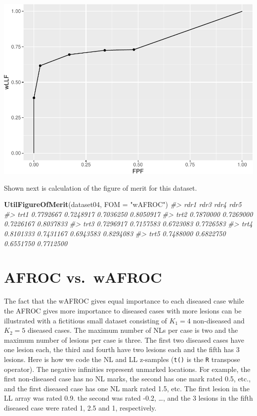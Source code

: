 \documentclass[
]{book}
\newenvironment{Shaded}{\begin{snugshade}}{\end{snugshade}}
\newcommand{\CommentTok}[1]{\textcolor[rgb]{0.56,0.35,0.01}{\textit{#1}}}
\newcommand{\DataTypeTok}[1]{\textcolor[rgb]{0.13,0.29,0.53}{#1}}
\newcommand{\KeywordTok}[1]{\textcolor[rgb]{0.13,0.29,0.53}{\textbf{#1}}}
\newcommand{\NormalTok}[1]{#1}
\newcommand{\StringTok}[1]{\textcolor[rgb]{0.31,0.60,0.02}{#1}}
\begin{document}
\includegraphics{03-empirical_files/figure-latex/unnamed-chunk-10-1.pdf}

Shown next is calculation of the figure of merit for this dataset.

\begin{Shaded}
\begin{Highlighting}[]
\KeywordTok{UtilFigureOfMerit}\NormalTok{(dataset04, }\DataTypeTok{FOM =} \StringTok{"wAFROC"}\NormalTok{)}
\CommentTok{#>           rdr1      rdr3      rdr4      rdr5}
\CommentTok{#> trt1 0.7792667 0.7248917 0.7036250 0.8050917}
\CommentTok{#> trt2 0.7870000 0.7269000 0.7226167 0.8037833}
\CommentTok{#> trt3 0.7296917 0.7157583 0.6723083 0.7726583}
\CommentTok{#> trt4 0.8101333 0.7431167 0.6943583 0.8294083}
\CommentTok{#> trt5 0.7488000 0.6822750 0.6551750 0.7712500}
\end{Highlighting}
\end{Shaded}

\hypertarget{empirical-numerical-understanding}{%
\section{AFROC vs.~wAFROC}\label{empirical-numerical-understanding}}

The fact that the wAFROC gives equal importance to each diseased case while the AFROC gives more importance to diseased cases with more lesions can be illustrated with a fictitious small dataset consisting of \(K_1 = 4\) non-diseased and \(K_2 = 5\) diseased cases. The maximum number of NLs per case is two and the maximum number of lesions per case is three. The first two diseased cases have one lesion each, the third and fourth have two lesions each and the fifth has 3 lesions. Here is how we code the NL and LL z-samples (\texttt{t()} is the \texttt{R} transpose operator). The negative infinities represent unmarked locations. For example, the first non-diseased case has no NL marks, the second has one mark rated 0.5, etc., and the first diseased case has one NL mark rated 1.5, etc. The first lesion in the LL array was rated 0.9. the second was rated -0.2, \ldots, and the 3 lesions in the fifth diseased case were rated 1, 2.5 and 1, respectively.
\end{document}
